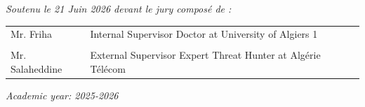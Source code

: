 \documentclass[11pt,a4paper]{report}
\begin{document}
\begin{titlepage}
    \vspace{0.6cm}
    
    \textit{Soutenu le 21 Juin 2026 devant le jury compos\'{e} de :}
    
    \vspace{0.3cm}
    
    \begin{tabular}{ll}
        Mr. Friha \hspace{1.5cm} & Internal Supervisor \hspace{1.5cm} Doctor at University of Algiers 1 \\
        \\
        Mr. Salaheddine \hspace{1.5cm} & External Supervisor \hspace{1.5cm} Expert Threat Hunter at Alg\'{e}rie T\'{e}l\'{e}com
    \end{tabular}
    
    \vspace{0.6cm}
    \textit{Academic year: 2025-2026}
    
\end{titlepage}

\newpage


\newpage


\newpage


\newpage



\newpage


\newpage


\newpage


\newpage


\newpage

\end{document}
